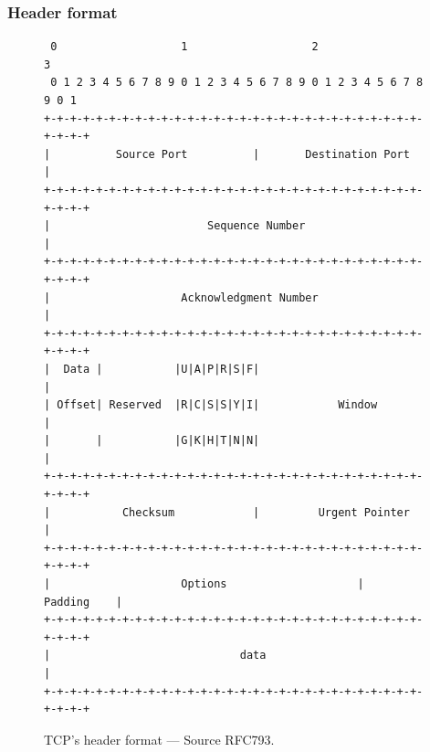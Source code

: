 \documentclass[pdftex,12pt,a4paper]{article}
\begin{document}
            \subsubsection{Header format}
                \begin{figure}[tbh]
                        \centering
                        \small\begin{verbatim} 0                   1                   2                   3
 0 1 2 3 4 5 6 7 8 9 0 1 2 3 4 5 6 7 8 9 0 1 2 3 4 5 6 7 8 9 0 1
+-+-+-+-+-+-+-+-+-+-+-+-+-+-+-+-+-+-+-+-+-+-+-+-+-+-+-+-+-+-+-+-+
|          Source Port          |       Destination Port        |
+-+-+-+-+-+-+-+-+-+-+-+-+-+-+-+-+-+-+-+-+-+-+-+-+-+-+-+-+-+-+-+-+
|                        Sequence Number                        |
+-+-+-+-+-+-+-+-+-+-+-+-+-+-+-+-+-+-+-+-+-+-+-+-+-+-+-+-+-+-+-+-+
|                    Acknowledgment Number                      |
+-+-+-+-+-+-+-+-+-+-+-+-+-+-+-+-+-+-+-+-+-+-+-+-+-+-+-+-+-+-+-+-+
|  Data |           |U|A|P|R|S|F|                               |
| Offset| Reserved  |R|C|S|S|Y|I|            Window             |
|       |           |G|K|H|T|N|N|                               |
+-+-+-+-+-+-+-+-+-+-+-+-+-+-+-+-+-+-+-+-+-+-+-+-+-+-+-+-+-+-+-+-+
|           Checksum            |         Urgent Pointer        |
+-+-+-+-+-+-+-+-+-+-+-+-+-+-+-+-+-+-+-+-+-+-+-+-+-+-+-+-+-+-+-+-+
|                    Options                    |    Padding    |
+-+-+-+-+-+-+-+-+-+-+-+-+-+-+-+-+-+-+-+-+-+-+-+-+-+-+-+-+-+-+-+-+
|                             data                              |
+-+-+-+-+-+-+-+-+-+-+-+-+-+-+-+-+-+-+-+-+-+-+-+-+-+-+-+-+-+-+-+-+\end{verbatim}\normalsize
                \vspace{-15pt}
                \caption{TCP's header format --- Source RFC793.}
                \label{fig:tcp}
                \end{figure}
\end{document}
